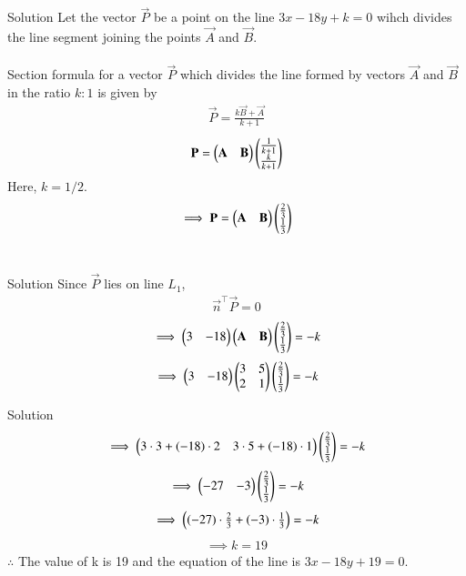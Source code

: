 \documentclass{beamer}
\begin{document}
\begin{frame}{Solution}
Let the vector $\vec{P}$ be a point on the line $3x - 18y+k=0$ wihch divides the line segment joining the points $\vec{A}$ and $\vec{B}$.
\\\\
Section formula for a vector $\vec{P}$ which divides the line formed by vectors $\vec{A}$ and $\vec{B}$ in the ratio $k:1$ is given by
\begin{align}
    \vec{P}=\frac{k\vec{B}+\vec{A}}{k+1}
\end{align}
\begin{align}
    \mathbf{P}=\begin{pmatrix}\mathbf{A} & \mathbf{B}\end{pmatrix}\begin{pmatrix}\frac{1}{k+1}\\\frac{k}{k+1}\end{pmatrix}
\end{align}
Here, $k=1/2$.
\begin{align}
    \implies \mathbf{P}=\begin{pmatrix}\mathbf{A} & \mathbf{B}\end{pmatrix}\begin{pmatrix}\frac{2}{3}\\\frac{1}{3}\end{pmatrix}
\end{align}\\
\end{frame}
\begin{frame}{Solution}
Since $\vec{P}$ lies on line $L_1$,
\begin{align}
    \vec{n}^{\top}\vec{P}=0
\end{align}
\begin{align}
    \implies \begin{pmatrix}3 &-18\end{pmatrix}\begin{pmatrix}\mathbf{A} & \mathbf{B}\end{pmatrix}\begin{pmatrix}\frac{2}{3}\\\frac{1}{3}\end{pmatrix}=-k
\end{align}
\begin{align}
    \implies \begin{pmatrix}3 & -18\end{pmatrix}\begin{pmatrix}3 & 5\\2 & 1\end{pmatrix}\begin{pmatrix}\frac{2}{3}\\\frac{1}{3}\end{pmatrix}=-k
\end{align}
\end{frame}
\begin{frame}{Solution}
\begin{align}
    \implies \begin{pmatrix}3\cdot 3 + (-18)\cdot 2 & 3\cdot 5 + (-18)\cdot 1\end{pmatrix}\begin{pmatrix}\frac{2}{3}\\\frac{1}{3}\end{pmatrix}=-k
\end{align}
\begin{align}
    \implies \begin{pmatrix}-27&-3\end{pmatrix}\begin{pmatrix}\frac{2}{3}\\\frac{1}{3}\end{pmatrix}=-k
\end{align}
\begin{align}
    \implies \begin{pmatrix}(-27)\cdot \frac{2}{3} + (-3)\cdot \frac{1}{3}\end{pmatrix}=-k
\end{align}
\begin{align}
    \implies k=19
\end{align}
$\therefore$ The value of k is 19 and the equation of the line is $3x - 18y+19=0$.   
\end{frame}
\end{document}

